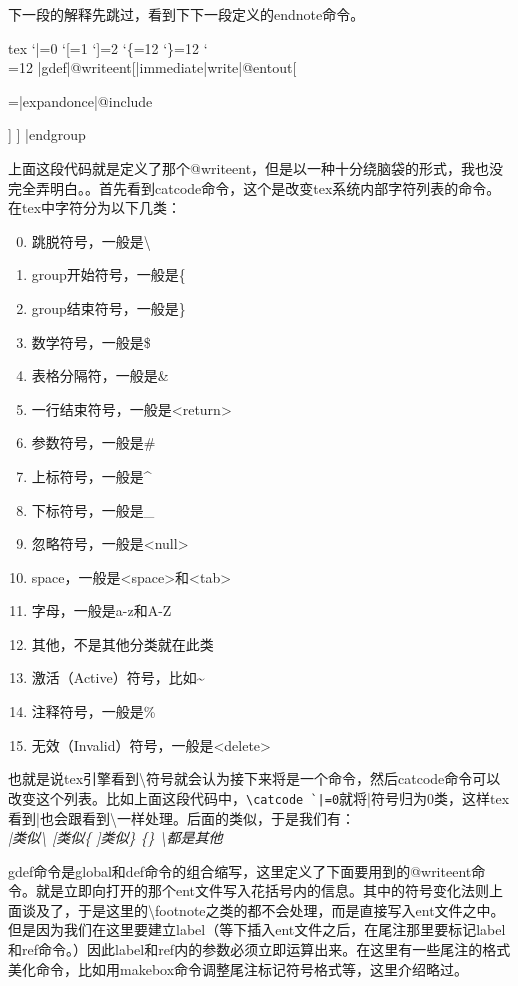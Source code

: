 \documentclass[11pt,oneside]{book}
\begin{document}
\begin{common-format}
下一段的解释先跳过，看到下下一段定义的endnote命令。
\begin{cverbatim}{tex}
\begingroup \catcode `|=0 \catcode `[=1
\catcode`]=2 \catcode `\{=12 \catcode `\}=12
\catcode`\\=12
|gdef|@writeent[|immediate|write|@entout[
{\footnotesize
\hspace{-2\parindent}
\leftskip=\parindent   |expandonce|@include \par } ] ]%
|endgroup
\end{cverbatim}
上面这段代码就是定义了那个@writeent，但是以一种十分绕脑袋的形式，我也没完全弄明白。。首先看到catcode命令，这个是改变tex系统内部字符列表的命令。在tex中字符分为以下几类：
\begin{enumerate}
\setcounter{enumi}{-1}
\item 跳脱符号，一般是\textbackslash
\item group开始符号，一般是\{
\item group结束符号，一般是\}
\item 数学符号，一般是\$
\item 表格分隔符，一般是\&
\item 一行结束符号，一般是<return>
\item 参数符号，一般是\#
\item 上标符号，一般是\^{}
\item 下标符号，一般是\_
\item 忽略符号，一般是<null>
\item space，一般是<space>和<tab>
\item 字母，一般是a-z和A-Z
\item 其他，不是其他分类就在此类
\item 激活（Active）符号，比如\~{}
\item 注释符号，一般是\%
\item 无效（Invalid）符号，一般是<delete>
\end{enumerate}
也就是说tex引擎看到\textbackslash 符号就会认为接下来将是一个命令，然后catcode命令可以改变这个列表。比如上面这段代码中，\verb+\catcode `|=0+就将|符号归为0类，这样tex看到|也会跟看到\textbackslash 一样处理。后面的类似，于是我们有：\\
\emph{|类似\textbackslash{  }   [类似\{  ]类似\}  \{\} \textbackslash 都是其他 }

gdef命令是global和def命令的组合缩写，这里定义了下面要用到的@writeent命令。就是立即向打开的那个ent文件写入花括号内的信息。其中的符号变化法则上面谈及了，于是这里的\textbackslash footnote之类的都不会处理，而是直接写入ent文件之中。但是因为我们在这里要建立label（等下插入ent文件之后，在尾注那里要标记label和ref命令。）因此label和ref内的参数必须立即运算出来。在这里有一些尾注的格式美化命令，比如用makebox命令调整尾注标记符号格式等，这里介绍略过。


\end{common-format}
\end{document}
